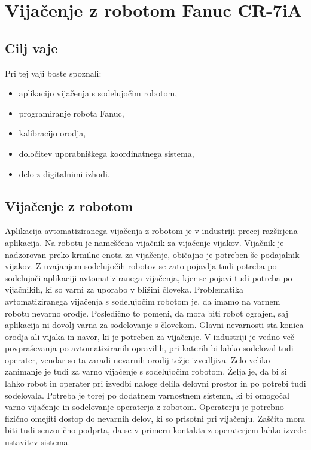 \chapter{Vijačenje z robotom Fanuc CR-7iA}%


\begin{mdframed}[backgroundcolor=green!20, shadow=true,roundcorner=8pt]
\vspace{-0.35cm}
	
\section{Cilj vaje}
	
Pri tej vaji boste spoznali:
\begin{itemize}
	\item aplikacijo vijačenja s sodelujočim robotom,
	\item programiranje robota Fanuc,
	\item kalibracijo orodja,
	\item določitev uporabniškega koordinatnega sistema,
	\item delo z digitalnimi izhodi.
\end{itemize}
	
\end{mdframed}

\section{Vijačenje z robotom}
Aplikacija avtomatiziranega vijačenja z robotom je v industriji precej razširjena aplikacija. Na robotu je nameščena vijačnik za vijačenje vijakov. Vijačnik je nadzorovan preko krmilne enota za vijačenje, običajno je potreben še podajalnik vijakov. Z uvajanjem sodelujočih robotov se zato pojavlja tudi potreba po sodelujoči aplikaciji avtomatiziranega vijačenja, kjer se pojavi tudi potreba po vijačnikih, ki so varni za uporabo v bližini človeka. Problematika avtomatiziranega vijačenja s sodelujočim robotom je, da imamo na varnem robotu nevarno orodje. Posledično to pomeni, da mora biti robot ograjen, saj aplikacija ni dovolj varna za sodelovanje s človekom. Glavni nevarnosti sta konica orodja ali vijaka in navor, ki je potreben za vijačenje.
V industriji je vedno več povpraševanja po avtomatiziranih opravilih, pri katerih bi lahko sodeloval tudi operater, vendar so ta zaradi nevarnih orodij težje izvedljiva. Zelo veliko zanimanje je tudi za varno vijačenje s sodelujočim robotom. Želja je, da bi si lahko robot in operater pri izvedbi naloge delila delovni prostor in po potrebi tudi sodelovala. Potreba je torej po dodatnem varnostnem sistemu, ki bi omogočal varno vijačenje in sodelovanje operaterja z robotom. Operaterju je potrebno fizično omejiti dostop do nevarnih delov, ki so prisotni pri vijačenju. Zaščita mora biti tudi senzorično podprta, da se v primeru kontakta z operaterjem lahko izvede ustavitev sistema.


